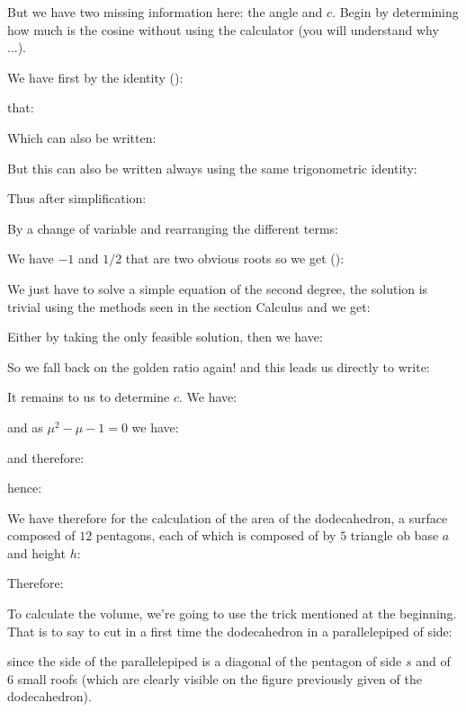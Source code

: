 {	But we have two missing information here: the angle and $c$. Begin by determining how much is the cosine without using the calculator (you will understand why ...).

	We have first by the identity ():
	
	that:
	
	Which can also be written:
	
	But this can also be written always using the same trigonometric identity:
	
	Thus after simplification:
	
	By a change of variable and rearranging the different terms:
	
	We have $-1$ and $1/2$ that are two obvious roots so we get ():
	
	We just have to solve a simple equation of the second degree, the solution is trivial using the methods seen in the section Calculus and we get:
	
	Either by taking the only feasible solution, then we have:
	
	So we fall back on the golden ratio again! and this leads us directly to write:
	
	It remains to us to determine $c$. We have:
	
	and as $\mu^2-\mu-1=0$ we have:
	
	and therefore:
	
	hence:
	
	We have therefore for the calculation of the area of the dodecahedron, a surface composed of $12$ pentagons, each of which is composed of by $5$ triangle ob base $a$ and  height $h$:
		
	Therefore:
	
	To calculate the volume, we're going to use the trick mentioned at the beginning. That is to say to cut in a first time the dodecahedron in a parallelepiped of side:
	
	since the side of the parallelepiped is a diagonal of the pentagon of side $s$ and of $6$ small roofs (which are clearly visible on the figure previously given of the dodecahedron).
	
}
